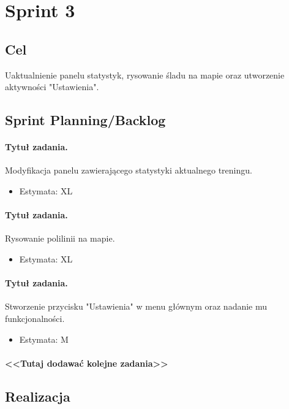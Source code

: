 \documentclass[a4paper]{article}
\begin{document}
\section{Sprint 3}

\subsection{Cel} Uaktualnienie panelu statystyk, rysowanie śladu na mapie oraz utworzenie aktywności "Ustawienia".

\subsection{Sprint Planning/Backlog}

\paragraph{Tytuł zadania.} Modyfikacja panelu zawierającego statystyki aktualnego treningu.
\begin{itemize}
\item Estymata: XL
\end{itemize}

\paragraph{Tytuł zadania.} Rysowanie polilinii na mapie.
\begin{itemize}
\item Estymata: XL
\end{itemize}

\paragraph{Tytuł zadania.} Stworzenie przycisku "Ustawienia" w menu głównym oraz nadanie mu funkcjonalności.
\begin{itemize}
\item Estymata: M
\end{itemize}

\paragraph{<<Tutaj dodawać kolejne zadania>>}

\subsection{Realizacja}
\end{document}
